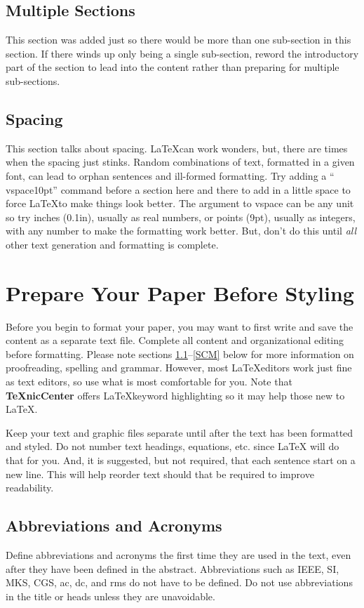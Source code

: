 \documentclass[journal]{IEEEtran}
\begin{document}
\subsection{Multiple Sections}

This section was added just so there would be more than one sub-section in this section.
If there winds up only being a single sub-section, reword the introductory part of the section to lead into the content rather than preparing for multiple sub-sections.

\subsection{Spacing}

This section talks about spacing.
\LaTeX can work wonders, but, there are times when the spacing just stinks.
Random combinations of text, formatted in a given font, can lead to orphan sentences and ill-formed formatting.
Try adding a ``\\vspace{10pt}'' command before a section here and there to add in a little space to force \LaTeX to make things look better.
The argument to vspace can be any unit so try inches (0.1in), usually as real numbers, or points (9pt), usually as integers, with any number to make the formatting work better.
But, don't do this until {\em all} other text generation and formatting is complete.

\section{Prepare Your Paper Before Styling}
Before you begin to format your paper, you may want to first write and save the content as a separate text file. 
Complete all content and organizational editing before formatting. 
Please note sections \ref{AA}--\ref{SCM} below for more information on proofreading, spelling and grammar.
However, most \LaTeX editors work just fine as text editors, so use what is most comfortable for you.
Note that {\bf TeXnicCenter} offers \LaTeX keyword highlighting so it may help those new to \LaTeX.

Keep your text and graphic files separate until after the text has been formatted and styled. 
Do not number text headings, equations, etc. since {\LaTeX} will do that for you.
And, it is suggested, but not required, that each sentence start on a new line.
This will help reorder text should that be required to improve readability.

\subsection{Abbreviations and Acronyms}\label{AA}
Define abbreviations and acronyms the first time they are used in the text, even after they have been defined in the abstract. 
Abbreviations such as IEEE, SI, MKS, CGS, ac, dc, and rms do not have to be defined. 
Do not use abbreviations in the title or heads unless they are unavoidable.
\end{document}
